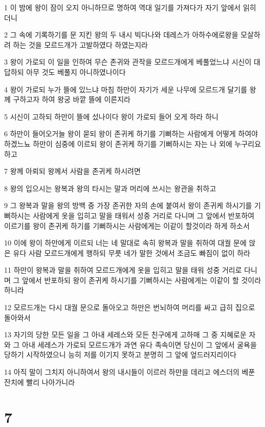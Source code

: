 \par 1 이 밤에 왕이 잠이 오지 아니하므로 명하여 역대 일기를 가져다가 자기 앞에서 읽히더니
\par 2 그 속에 기록하기를 문 지킨 왕의 두 내시 빅다나와 데레스가 아하수에로왕을 모살하려 하는 것을 모르드개가 고발하였다 하였는지라
\par 3 왕이 가로되 이 일을 인하여 무슨 존귀와 관작을 모르드개에게 베풀었느냐 시신이 대답하되 아무 것도 베풀지 아니하였나이다
\par 4 왕이 가로되 누가 뜰에 있느냐 마침 하만이 자기가 세운 나무에 모르드개 달기를 왕께 구하고자 하여 왕궁 바깥 뜰에 이른지라
\par 5 시신이 고하되 하만이 뜰에 섰나이다 왕이 가로되 들어 오게 하라 하니
\par 6 하만이 들어오거늘 왕이 묻되 왕이 존귀케 하기를 기뻐하는 사람에게 어떻게 하여야 하겠느뇨 하만이 심중에 이르되 왕이 존귀케 하기를 기뻐하시는 자는 나 외에 누구리요 하고
\par 7 왕께 아뢰되 왕께서 사람을 존귀케 하시려면
\par 8 왕의 입으시는 왕복과 왕의 타시는 말과 머리에 쓰시는 왕관을 취하고
\par 9 그 왕복과 말을 왕의 방백 중 가장 존귀한 자의 손에 붙여서 왕이 존귀케 하시기를 기뻐하시는 사람에게 옷을 입히고 말을 태워서 성중 거리로 다니며 그 앞에서 반포하여 이르기를 왕이 존귀케 하기를 기뻐하시는 사람에게는 이같이 할것이라 하게 하소서
\par 10 이에 왕이 하만에게 이르되 너는 네 말대로 속히 왕복과 말을 취하여 대궐 문에 앉은 유다 사람 모르드개에게 행하되 무릇 네가 말한 것에서 조금도 빠짐이 없이 하라
\par 11 하만이 왕복과 말을 취하여 모르드개에게 옷을 입히고 말을 태워 성중 거리로 다니며 그 앞에서 반포하되 왕이 존귀케 하시기를 기뻐하시는 사람에게는 이같이 할 것이라 하니라
\par 12 모르드개는 다시 대궐 문으로 돌아오고 하만은 번뇌하여 머리를 싸고 급히 집으로 돌아와서
\par 13 자기의 당한 모든 일을 그 아내 세레스와 모든 친구에게 고하매 그 중 지혜로운 자와 그 아내 세레스가 가로되 모르드개가 과연 유다 족속이면 당신이 그 앞에서 굴욕을 당하기 시작하였으니 능히 저를 이기지 못하고 분명히 그 앞에 엎드러지리이다
\par 14 아직 말이 그치지 아니하여서 왕의 내시들이 이르러 하만을 데리고 에스더의 베푼 잔치에 빨리 나아가니라

\chapter{7}

